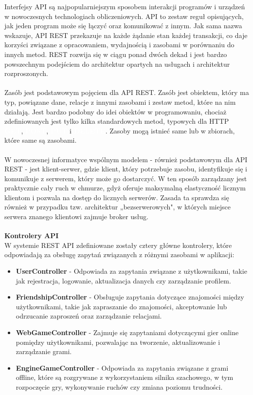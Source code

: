 \documentclass[12pt,a4paper]{article}
\begin{document}
Interfejsy API są najpopularniejszym sposobem interakcji programów i urządzeń w nowoczesnych technologiach obliczeniowych. API to zestaw reguł opisujących, jak jeden program może się łączyć oraz komunikować z innym. Jak sama nazwa wskazuje, API REST przekazuje na każde żądanie stan każdej transakcji, co daje korzyści związane z opracowaniem, wydajnością i zasobami w porównaniu do innych metod. REST rozwija się w ciągu ponad dwóch dekad i jest bardzo powszechnym podejściem do architektur opartych na usługach i architektur rozproszonych.
\\\\
Zasób jest podstawowym pojęciem dla API REST. Zasób jest obiektem, który ma typ, powiązane dane, relacje z innymi zasobami i zestaw metod, które na nim działają. Jest bardzo podobny do idei obiektów w programowaniu, chociaż zdefiniowanych jest tylko kilka standardowych metod, typowych dla HTTP \textbf{\colorbox{cyan!90}{\textcolor{white}{GET}}}, \textbf{\colorbox{green!90}{\textcolor{white}{POST}}}, \textbf{\colorbox{orange!90}{\textcolor{white}{PUT}}} i \textbf{\colorbox{red!90}{\textcolor{white}{DELETE}}}. Zasoby mogą istnieć same lub w zbiorach, które same są zasobami.
\\\\
W nowoczesnej informatyce wspólnym modelem - również podstawowym dla API REST - jest klient-serwer, gdzie klient, który potrzebuje zasobu, identyfikuje się i komunikuje z serwerem, który może go dostarczyć. W ten sposób zarządzany jest praktycznie cały ruch w chmurze, gdyż oferuje maksymalną elastyczność licznym klientom i pozwala na dostęp do licznych serwerów. Zasada ta sprawdza się również w przypadku tzw. architektur „bezserwerowych", w których miejsce serwera znanego klientowi zajmuje broker usług.
\\\\

\noindent \textbf{Kontrolery API} \\
W systemie REST API zdefiniowane zostały cztery główne kontrolery, które odpowiadają za obsługę zapytań związanych z różnymi zasobami w aplikacji:

\begin{itemize}
    \item \textbf{UserController} - Odpowiada za zapytania związane z użytkownikami, takie jak rejestracja, logowanie, aktualizacja danych czy zarządzanie profilem.
    \item \textbf{FriendshipController} - Obsługuje zapytania dotyczące znajomości między użytkownikami, takie jak zapraszanie do znajomości, akceptowanie lub odrzucanie zaproszeń oraz zarządzanie relacjami.
    \item \textbf{WebGameController} - Zajmuje się zapytaniami dotyczącymi gier online pomiędzy użytkownikami, pozwalając na tworzenie, aktualizowanie i zarządzanie grami.
    \item \textbf{EngineGameController} - Odpowiada za zapytania związane z grami offline, które są rozgrywane z wykorzystaniem silnika szachowego, w tym rozpoczęcie gry, wykonywanie ruchów czy zmiana poziomu trudności.
\end{itemize}
\end{document}
